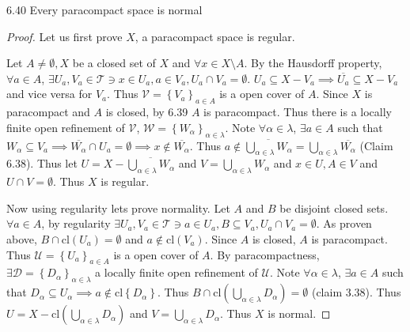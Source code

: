 \documentclass{article}
\newcommand*{\T}{\mathcal{T}}
\newcommand*{\U}{\mathcal{U}}
\newcommand*{\cl}{\mathrm{cl}}
\newcommand*{\subeq}{\subseteq}
\newcommand*{\empset}{\emptyset}
\begin{document}
\bigskip

\begin{claim}{6.40}\label{Claim 6.40.}
    Every paracompact space is normal
\end{claim}
\begin{proof}
    Let us first prove $X$, a paracompact space is regular. 
    
    Let $A \neq \empset, X$ be a closed set of $X$ and $\forall x \in X \setminus A$. By the Hausdorff property, $\forall a \in A$, $\exists U_{a}, V_a \in \T \ni x \in U_a, a \in V_a, U_a \cap V_a = \empset$. $U_a \subseteq X - V_a \implies \overline{U_a} \subeq X - V_a$ and vice versa for $V_a$. Thus $\mathcal{V} = \left\{ V_{a} \right\}_{a \in A}$ is a open cover of $A$. Since $X$ is paracompact and $A$ is closed, by 6.39 $A$ is paracompact. Thus there is a locally finite open refinement of $\mathcal{V}$, $\mathcal{W} = \left\{ W_{\alpha} \right\}_{\alpha \in \lambda}$. Note $\forall \alpha \in \lambda$, $\exists a \in A$ such that $W_\alpha \subeq V_a \implies \overline{W_\alpha} \cap U_{a} = \empset \implies x \not \in \overline{W_\alpha}$. Thus $a \not \in \overline{\bigcup_{\alpha \in \lambda} W_\alpha} = \bigcup_{\alpha \in \lambda} \overline{W_\alpha}$ (Claim 6.38). Thus let $U = X - \overline{\bigcup_{\alpha \in \lambda} W_\alpha}$ and $V = \bigcup_{\alpha \in \lambda} W_\alpha$ and $x \in U, A \in V$ and $U \cap V = \empset$. Thus $X$ is regular. 
    
    
    Now using regularity lets prove normality. Let $A$ and $B$ be disjoint closed sets. $\forall a \in A$, by regularity $\exists U_a, V_a \in \T \ni a \in U_a, B \subeq V_a, U_a \cap V_a = \empset$. As proven above, $B \cap \cl(U_a) = \empset$ and $a \not \in \cl(V_a)$. Since $A$ is closed, $A$ is paracompact. Thus $\mathcal{U} = \left\{ U_a \right\}_{a \in A}$ is a open cover of $A$. By paracompactness, $\exists \mathcal{D} = \left\{ D_{\alpha} \right\}_{\alpha \in \lambda}$ a locally finite open refinement of $\U$. Note $\forall \alpha \in \lambda$, $\exists a \in A $ such that $D_\alpha \subeq U_\alpha \implies a \not \in \cl\left\{ D_\alpha \right\}$. Thus $B  \cap  \cl\left(\bigcup_{\alpha \in \lambda} D_\alpha\right) = \empset$ (claim 3.38). Thus $U = X - \cl\left(\bigcup_{\alpha \in \lambda} D_\alpha\right)$ and $V = \bigcup_{\alpha \in \lambda} D_\alpha$. Thus $X$ is normal.     
\end{proof}

\bigskip
\end{document}

